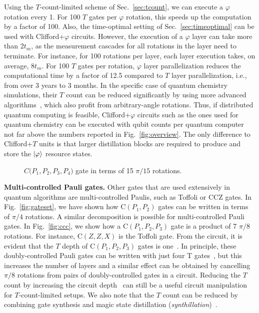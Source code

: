 \documentclass[prx,aps,letterpaper,twocolumn,allowfontchageintitle=true,accepted=2019-02-01]{quantumarticle}
\begin{document}
Using the $T$-count-limited scheme of Sec.~\ref{sec:tcount}, we can execute a $\varphi$ rotation every 1\clock. For 100 $T$ gates per $\varphi$ rotation, this speeds up the computation by a factor of 100. Also, the time-optimal setting of Sec.~\ref{sec:timeoptimal} can be used with Clifford+$\varphi$ circuits. However, the execution of a $\varphi$ layer can take more than 2$t_m$, as the measurement cascades for all rotations in the layer need to terminate. For instance, for 100 rotations per layer, each layer execution takes, on average, 8$t_m$. For 100 $T$ gates per rotation, $\varphi$ layer parallelization reduces the computational time by a factor of 12.5 compared to $T$ layer parallelization, i.e., from over 3 years to 3 months. In the specific case of quantum chemistry simulations, their $T$ count can be reduced significantly by using more advanced algorithms~\cite{Low2016,Low2017,Babbush2018a}, which also profit from arbitrary-angle rotations. Thus, if distributed quantum computing is feasible, Clifford+$\varphi$ circuits such as the ones used for quantum chemistry can be executed with qubit counts per quantum computer not far above the numbers reported in Fig.~\ref{fig:overview}. The only difference to Clifford+$T$ units is that larger distillation blocks are required to produce and store the $\ket{\varphi}$ resource states.



\begin{figure}[t!]
\centering
\def\svgwidth{0.88\linewidth}

\caption{$C\mathrm(P_1,P_2,P_3,P_4)$ gate in terms of 15 $\pi/15$ rotations.}
\label{fig:cccc}
\end{figure}



\textbf{Multi-controlled Pauli gates.} Other gates that are used extensively in quantum algorithms are multi-controlled Paulis, such as Toffoli or CCZ gates. In Fig.~\ref{fig:gateset}, we have shown how $\mathrm{C}(P_1,P_2)$ gates can be written in terms of $\pi/4$ rotations. A similar decomposition is possible for multi-controlled Pauli gates. In Fig.~\ref{fig:ccc}, we show how a $\mathrm{C}(P_1,P_2,P_3)$ gate is a product of 7 $\pi/8$ rotations. For instance, $\mathrm{C}(Z,Z,X)$ is the Toffoli gate. From the circuit, it is evident that the $T$ depth of $\mathrm{C}(P_1,P_2,P_3)$ gates is one~\cite{Selinger2013}. In principle, these doubly-controlled Pauli gates can be written with just four T gates~\cite{Jones2013}, but this increases the number of layers and a similar effect can be obtained by cancelling $\pi/8$ rotations from pairs of doubly-controlled gates in a circuit. Reducing the $T$ count by increasing the circuit depth~\cite{Gidney2018} can still be a useful circuit manipulation for $T$-count-limited setups. We also note that the $T$ count can be reduced by combining gate synthesis and magic state distillation (\textit{synthillation})~\cite{Campbell2017,Ogorman2017}.
\end{document}
